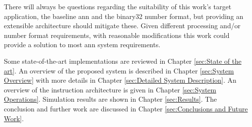There will always be questions regarding the suitability of this work's target application, the baseline \ac{ann} and the \ac{binary32} number format, but providing an extensible architecture should mitigate these.
Given different processing and/or number format requirements, with reasonable modifications this work could provide a solution to most \ac{ann} system requirements.

\hfill %

\iffalse
An overview of \ac{3dic} technology is given in Chapter \ref{sec:3dic}.
An overview on the pros and cons of \ac{dram} and \ac{sram} along with some proposed \ac{dram} customizations are given in Chapter \ref{sec:DRAM Customizations}.
\fi
Some state-of-the-art implementations are reviewed in Chapter \ref{sec:State of the art}.
An overview of the proposed system is described in Chapter \ref{sec:System Overview} with more details in Chapter \ref{sec:Detailed System Description}.
An overview of the instruction architecture is given in Chapter \ref{sec:System Operations}.
Simulation results are shown in Chapter \ref{sec:Results}.
The conclusion and further work are discussed in Chapter \ref{sec:Conclusions and Future Work}.
